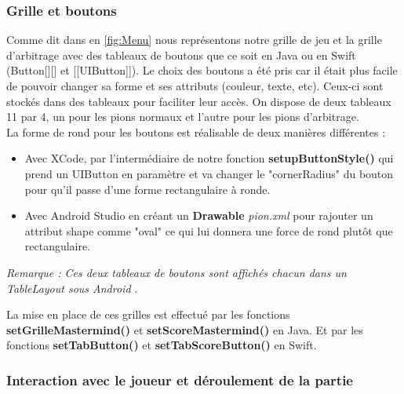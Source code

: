 \documentclass{article}
\begin{document}
\subsubsection{Grille et boutons}

Comme dit dans en \ref{fig:Menu} nous représentons notre grille de jeu et la grille d'arbitrage avec des tableaux de boutons que ce soit en Java ou en Swift (Button[][] et [[UIButton]]). Le choix des boutons a été pris car il était plus facile de pouvoir changer sa forme et ses attributs (couleur, texte, etc). 
Ceux-ci sont stockés dans des tableaux pour faciliter leur accès. On dispose de deux tableaux 11 par 4, un pour les pions normaux et l'autre pour les pions d'arbitrage. 
\\
La forme de rond pour les boutons est réalisable de deux manières différentes :
\begin{itemize}
\item Avec XCode, par l'intermédiaire de notre fonction \textbf{setupButtonStyle()} qui prend un UIButton en paramètre et va changer le "cornerRadius" du bouton pour qu'il passe d'une forme rectangulaire à ronde.
\\
\item Avec Android Studio en créant un \textbf{Drawable} \textit{pion.xml} pour rajouter un attribut shape comme "oval" ce qui lui donnera une force de rond plutôt que rectangulaire. 
\end{itemize} 


\textit{Remarque : Ces deux tableaux de boutons sont affichés chacun dans un TableLayout sous Android }.

La mise en place de ces grilles est effectué par les fonctions \textbf{setGrilleMastermind()} et \textbf{setScoreMastermind()} en Java. Et par les fonctions \textbf{setTabButton()} et \textbf{setTabScoreButton()} en Swift.

\subsubsection{Interaction avec le joueur et déroulement de la partie}
\end{document}
